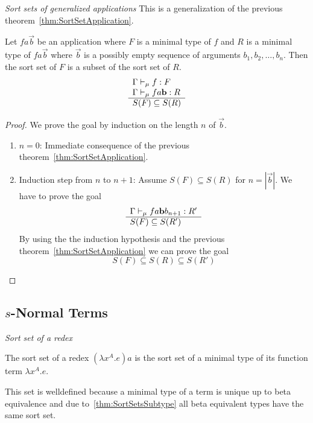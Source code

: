 \begin{theorem}
    \label{thm:SortSetApplications}
    \emph{Sort sets of generalized applications} This is a generalization of the
    previous theorem~\ref{thm:SortSetApplication}.

    Let $fa \vec b$ be an application where
    $F$ is a minimal type of $f$ and $R$ is a minimal type of $fa \vec b$ where
    $\vec b$ is a possibly empty sequence of arguments $b_1, b_2, \ldots, b_n$.
    Then the sort set of $F$ is a subset of the sort set of $R$.
    $$
    \begin{array}{l} 
        \Gamma \vdash_\mu f : F
        \\
        \Gamma \vdash_\mu f a {\mathbf b} : R
     \\ \hline 
        S(F) \subseteq S(R)
    \end{array}
    $$
    \begin{proof}
        We prove the goal by induction on the length $n$ of $\vec b$.
        \begin{enumerate}
            \item $n=0$: Immediate consequence of the previous
                theorem~\ref{thm:SortSetApplication}.

            \item Induction step from $n$ to $n+1$:
                Assume $S(F) \subseteq S(R)$ for $n = |\vec b|$. We have to
                prove the goal
                $$
                \begin{array}{l} 
                    \Gamma \vdash_\mu f a {\mathbf b} b_{n+1} : R'
                 \\ \hline 
                    S(F) \subseteq S(R')
                \end{array}
                $$
                By using the the induction hypothesis and the previous
                theorem~\ref{thm:SortSetApplication} we can prove the goal
                $$
                    S(F) \subseteq S(R) \subseteq S(R')
                $$
        \end{enumerate}
    \end{proof}
\end{theorem}






\subsection{$s$-Normal Terms}


\begin{definition}
    \label{def:RedexSortSet}
    \emph{Sort set of a redex}

    The sort set of a redex $(\lambda x^A. e) a$ is the sort set of a
    minimal type of its function term $\lambda x^A. e$.

    This set is welldefined because a minimal type of a term is unique up to
    beta equivalence and due to~\ref{thm:SortSetsSubtype} all beta equivalent
    types have the same sort set.
\end{definition}




